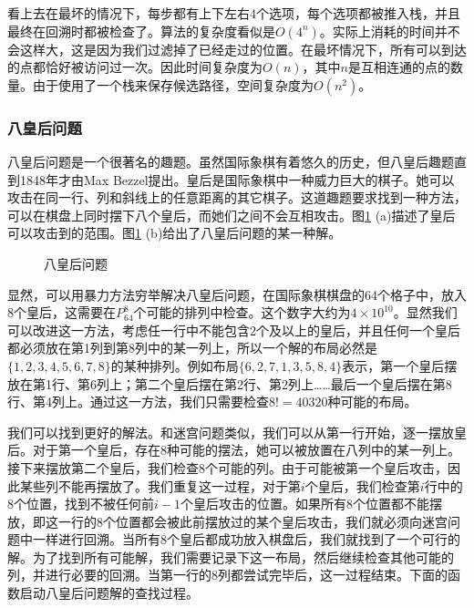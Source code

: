 \documentclass[b5paper]{ctexart}
\begin{document}
看上去在最坏的情况下，每步都有上下左右4个选项，每个选项都被推入栈，并且最终在回溯时都被检查了。算法的复杂度看似是$O(4^n)$。实际上消耗的时间并不会这样大，这是因为我们过滤掉了已经走过的位置。在最坏情况下，所有可以到达的点都恰好被访问过一次。因此时间复杂度为$O(n)$，其中$n$是互相连通的点的数量。由于使用了一个栈来保存候选路径，空间复杂度为$O(n^2)$。

\subsubsection{八皇后问题}

八皇后问题是一个很著名的趣题。虽然国际象棋有着悠久的历史，但八皇后趣题直到1848年才由Max Bezzel提出\cite{wiki-8-queens}。皇后是国际象棋中一种威力巨大的棋子。她可以攻击在同一行、列和斜线上的任意距离的其它棋子。这道趣题要求找到一种方法，可以在棋盘上同时摆下八个皇后，而她们之间不会互相攻击。图\ref{fig:8-queens-puzzle} (a)描述了皇后可以攻击到的范围。图\ref{fig:8-queens-puzzle} (b)给出了八皇后问题的某一种解。

\begin{figure}[htbp]
 \centering
 \caption{八皇后问题}
 \label{fig:8-queens-puzzle}
\end{figure}

显然，可以用暴力方法穷举解决八皇后问题，在国际象棋棋盘的64个格子中，放入8个皇后，这需要在$P^8_{64}$个可能的排列中检查。这个数字大约为$4 \times 10^{10}$。显然我们可以改进这一方法，考虑任一行中不能包含2个及以上的皇后，并且任何一个皇后都必须放在第1列到第8列中的某一列上，所以一个解的布局必然是$\{1,2,3,4,5,6,7,8\}$的某种排列。例如布局$\{6,2,7,1,3,5,8,4\}$表示，第一个皇后摆放在第1行、第6列上；第二个皇后摆在第2行、第2列上……最后一个皇后摆在第8行、第4列上。通过这一方法，我们只需要检查$8! = 40320$种可能的布局。

我们可以找到更好的解法。和迷宫问题类似，我们可以从第一行开始，逐一摆放皇后。对于第一个皇后，存在8种可能的摆法，她可以被放置在八列中的某一列上。接下来摆放第二个皇后，我们检查8个可能的列。由于可能被第一个皇后攻击，因此某些列不能再摆放了。我们重复这一过程，对于第$i$个皇后，我们检查第$i$行中的8个位置，找到不被任何前$i-1$个皇后攻击的位置。如果所有8个位置都不能摆放，即这一行的8个位置都会被此前摆放过的某个皇后攻击，我们就必须向迷宫问题中一样进行回溯。当所有8个皇后都成功放入棋盘后，我们就找到了一个可行的解。为了找到所有可能解，我们需要记录下这一布局，然后继续检查其他可能的列，并进行必要的回溯。当第一行的8列都尝试完毕后，这一过程结束。下面的函数启动八皇后问题解的查找过程。
\end{document}
